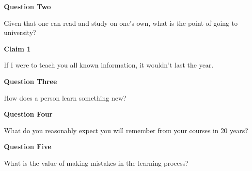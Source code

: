 \documentclass[12pt]{beamer}
\begin{document}

\begin{frame}{\textbf{Question Two}}

\parbox{\linewidth}{\begin{center}
\Huge Given that one can read and study on one's own, what is the point of going to university?
\end{center}}

\end{frame}


\begin{frame}{\textbf{Claim 1}}

\parbox{\linewidth}{\begin{center}
\Huge If I were to teach you all known information, it wouldn't last the year.
\end{center}}

\end{frame}


\begin{frame}{\textbf{Question Three}}

\parbox{\linewidth}{\begin{center}
\Huge How does a person learn something new?
\end{center}}

\end{frame}


\begin{frame}{\textbf{Question Four}}

\parbox{\linewidth}{\begin{center}
\Huge What do you reasonably expect you will remember from your courses in 20 years?
\end{center}}

\end{frame}


\begin{frame}{\textbf{Question Five}}

\parbox{\linewidth}{\begin{center}
\Huge What is the value of making mistakes in the learning process?
\end{center}}

\end{frame}
\end{document}
